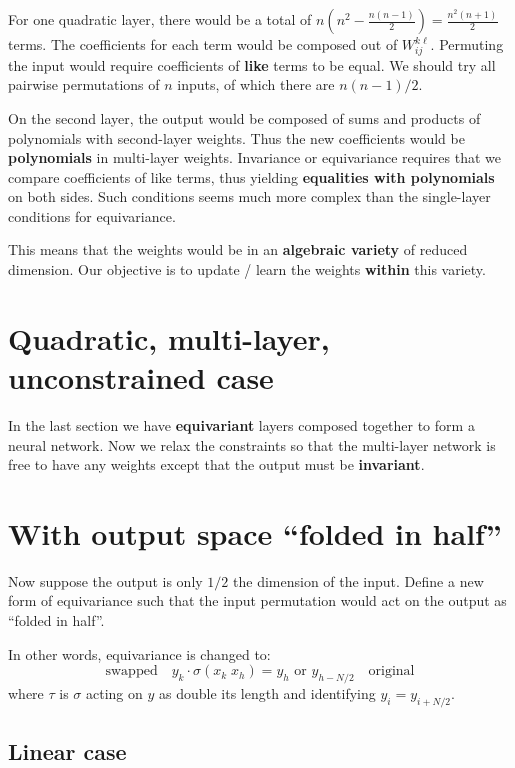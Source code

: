 For one quadratic layer, there would be a total of $\displaystyle n \left( n^2 - \frac{n (n - 1)}{2} \right) = \frac{n^2 (n + 1)}{2}$ terms.  The coefficients for each term would be composed out of $W_{ij}^{k \ell}$.  Permuting the input would require coefficients of \textbf{like} terms to be equal.  We should try all pairwise permutations of $n$ inputs, of which there are $n (n - 1) / 2$.

On the second layer, the output would be composed of sums and products of polynomials with second-layer weights.  Thus the new coefficients would be \textbf{polynomials} in multi-layer weights.  Invariance or equivariance requires that we compare coefficients of like terms, thus yielding \textbf{equalities with polynomials} on both sides.  Such conditions seems much more complex than the single-layer conditions for equivariance.

This means that the weights would be in an \textbf{algebraic variety} of reduced dimension.  Our objective is to update / learn the weights \textbf{within} this variety.  

\section{Quadratic, multi-layer, unconstrained case}

In the last section we have \textbf{equivariant} layers composed together to form a neural network.  Now we relax the constraints so that the multi-layer network is free to have any weights except that the output must be \textbf{invariant}.


\section{With output space ``folded in half''}

Now suppose the output is only $1/2$ the dimension of the input.  Define a new form of equivariance such that the input permutation would act on the output as ``folded in half''. 

In other words, equivariance is changed to:
\begin{equation}
\boxed{\mbox{swapped}} \quad y_k \cdot \sigma(x_k \; x_h) = y_h \mbox{  or  } y_{h-N/2} \quad \boxed{\mbox{original}} \end{equation}
where $\tau$ is $\sigma$ acting on $y$ as double its length and identifying $y_i = y_{i + N/2}$.

\subsection{Linear case}

